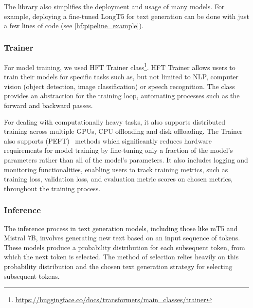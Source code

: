 \documentclass[english, ba, kiv, he, iso690numb, pdf, viewonly]{fasthesis}
\begin{document}
The library also simplifies the deployment and usage of many models. For example, deploying a fine-tuned LongT5 for text generation can be done with just a few lines of code (see \ref{hf:pipeline_example}).

\subsubsection{Trainer} \label{hf:trainer}
For model training, we used HFT Trainer class\footnote{\url{https://huggingface.co/docs/transformers/main_classes/trainer}}. HFT Trainer allows users to train their models for specific tasks such as, but not limited to NLP, computer vision (object detection, image classification) or speech recognition.
The class provides an abstraction for the training loop, automating processes such as the forward and backward passes.

For dealing with computationally heavy tasks, it also supports distributed training across multiple GPUs, CPU offloading and disk offloading. The Trainer also supports  (PEFT)~\cite{peft} methods which significantly reduces hardware requirements for model training by fine-tuning only a fraction of the model's parameters rather than all of the model's parameters.
It also includes logging and monitoring functionalities, enabling users to track training metrics, such as training loss, validation loss, and evaluation metric scores on chosen metrics, throughout the training process.

\subsubsection{Inference}
The inference process in text generation models, including those like mT5 and Mistral 7B, involves generating new text based on an input sequence of tokens. These models produce a probability distribution for each subsequent token, from which the next token is selected. The method of selection relies heavily on this probability distribution and the chosen text generation strategy for selecting subsequent tokens.
\end{document}
